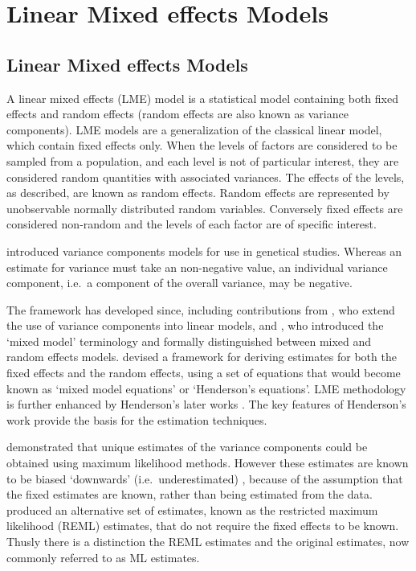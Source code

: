 \documentclass[12pt, a4paper]{report}
\theoremstyle{plain}
\theoremstyle{definition}
\theoremstyle{remark}
\begin{document}
\chapter{Linear Mixed effects Models}


\section{Linear Mixed effects Models}
A linear mixed effects (LME) model is a statistical model containing both fixed effects and random effects (random effects are also known as variance components). LME models are a generalization of the classical linear model, which contain fixed effects only. When the levels of factors are considered to be sampled from a population,
and each level is not of particular interest, they are considered random quantities with associated variances.
The effects of the levels, as described, are known as random effects. Random effects are represented by unobservable
normally distributed random variables. Conversely fixed effects are considered non-random and the
levels of each factor are of specific interest.

\citet{Fisher4} introduced variance components models for use in genetical studies. Whereas an estimate for variance must take an non-negative value, an individual variance component, i.e.\ a component of the overall variance, may be negative.


The framework has developed since, including contributions from
\citet{tippett}, who extend the use of variance components into linear models, and \citet{eisenhart}, who introduced the `mixed model' terminology and formally distinguished between mixed and random effects models. \citet{Henderson:1950} devised a framework for deriving estimates for both the fixed effects and the random effects, using a set of equations that would become known as `mixed model equations' or `Henderson's equations'.
LME methodology is further enhanced by Henderson's later works \citep{Henderson53, Henderson59,Henderson63,Henderson73,Henderson84a}. The key features of Henderson's work provide the basis for the estimation techniques.

\citet{HartleyRao} demonstrated that unique estimates of the variance components could be obtained using maximum likelihood methods. However these estimates are known to be biased `downwards' (i.e.\ underestimated) , because of the assumption that the fixed estimates are known, rather than being estimated from the data. \citet{PattersonThompson} produced an alternative set of estimates, known as the restricted maximum likelihood (REML) estimates, that do not require the fixed effects to be known. Thusly there is a distinction the REML estimates and the original estimates, now commonly referred to as ML estimates.
\end{document}
